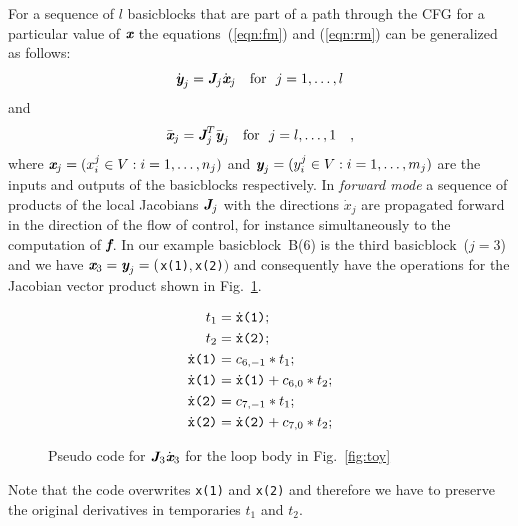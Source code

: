 \documentclass{book}
\newcommand{\basicblock}{basicblock}
\newcommand{\bmf}{\mbox{\bf\em f}}
\newcommand{\bmJ}{\mbox{\bf\em J}}
\newcommand{\bmx}{\mbox{\bf\em x}}
\newcommand{\bmy}{\mbox{\bf\em y}}
\newcommand{\code}[1]{{\small\tt{#1}}}
\newcommand{\reffig}[1]{{Fig.~\ref{#1}}}
\begin{document}
For a sequence of $l$ {\basicblock}s that are part of 
a path through the CFG for a particular value of $\bmx$ the 
equations~(\ref{eqn:fm}) and (\ref{eqn:rm}) can be generalized as follows:
\begin{equation} \label{eqn:bbfm}
  \dot{\bmy}_j=\bmJ_j \dot{\bmx}_j \quad \text{for}~~j=1,\ldots,l
\end{equation} 
and 
\begin{equation} \label{eqn:bbrm}
  \bar{\bmx}_j=\bmJ^T_j \bar{\bmy}_j \quad \text{for}~~j=l,\ldots,1\quad ,
\end{equation} 
where $\bmx_j = (x^j_i \in V :  i=1,\ldots,n_j)$ and
$\bmy_j = (y^j_i \in V : i=1,\ldots,m_j)$ are the inputs and outputs of the 
{\basicblock}s
respectively. 
In {\em forward mode} a sequence of 
products of the local Jacobians $\bmJ_j$ 
with the directions $\dot{x}_j$ 
are propagated forward in the direction of the flow of control, for 
instance simultaneously to the computation of $\bmf$.
In our example \basicblock\ B(6) is the third \basicblock\ ($j=3$) and we have
$\bmx_3=\bmy_j=($\code{x(1)}$,$\code{x(2)}$)$ and 
consequently have the operations for the Jacobian vector product shown 
in \reffig{fig:toyPreacc}.  
\begin{figure}[h]
  \begin{center}
    \begin{align*}
      t_1&=\dot{\tt x}\mbox{\tt (1)} ; \\
      t_2&=\dot{\tt x}\mbox{\tt (2)}; \\
      \dot{\tt x}\mbox{\tt (1)}&=c_{6,-1}*t_1; \\
      \dot{\tt x}\mbox{\tt (1)}&=\dot{\tt x}\mbox{\tt (1)}+c_{6,0}*t_2; \\
      \dot{\tt x}\mbox{\tt (2)}&=c_{7,-1}*t_1; \\
      \dot{\tt x}\mbox{\tt (2)}&=\dot{\tt x}\mbox{\tt (2)}+c_{7,0}*t_2; 
    \end{align*}
  \end{center}	
  \caption{Pseudo code for $\bmJ_3\dot{\bmx}_3$ for the loop body in \reffig{fig:toy}}\label{fig:toyPreacc}
\end{figure}
Note that the code overwrites \code{x(1)} and \code{x(2)} and therefore 
we have to preserve the original derivatives in temporaries $t_1$ and $t_2$.
\end{document}
